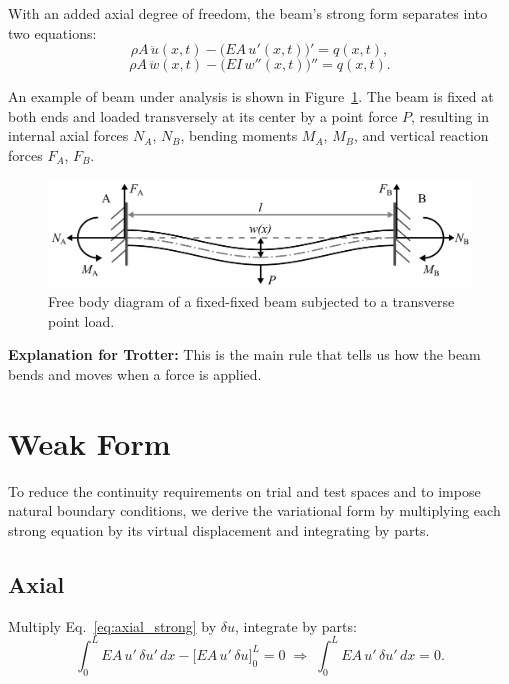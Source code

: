 \documentclass{article}
\begin{document}
	With an added axial degree of freedom, the beam’s strong form separates into two equations:
	\begin{equation}\label{eq:axial_strong}
		\rho A\,\ddot u(x,t)
		- \bigl(EA\,u'(x,t)\bigr)'
		= q(x,t),
	\end{equation}
	\begin{equation}\label{eq:transverse_strong}
		\rho A\,\ddot w(x,t)
		- \bigl(EI\,w''(x,t)\bigr)''
		= q(x,t).
	\end{equation}
	
	An example of beam under analysis is shown in Figure~\ref{fig:FFB}. The beam is fixed at both ends and loaded transversely at its center by a point force \(P\), resulting in internal axial forces \(N_A\), \(N_B\), bending moments \(M_A\), \(M_B\), and vertical reaction forces \(F_A\), \(F_B\).
	\begin{figure}[H]
		\centering
		\includegraphics[width=4.7in]{Figures/FFB_Figure.png}
		\caption[FFB]{\label{fig:FFB} 
			Free body diagram of a fixed-fixed beam subjected to a transverse point load.}
	\end{figure} 
	
	\textbf{Explanation for Trotter:} This is the main rule that tells us how the beam bends and moves when a force is applied.
	
	\section{Weak Form}
	To reduce the continuity requirements on trial and test spaces and to impose natural boundary conditions, we derive the variational form by multiplying each strong equation by its virtual displacement and integrating by parts.
	
	\subsection{Axial}
	Multiply Eq.~\eqref{eq:axial_strong} by \(\delta u\), integrate by parts:
	\begin{equation}\label{eq:axial_weak}
		\int_0^L EA\,u'\,\delta u'\,dx 
		- \bigl[EA\,u'\,\delta u\bigr]_0^L = 0
		\;\Longrightarrow\;
		\int_0^L EA\,u'\,\delta u'\,dx = 0.
	\end{equation}
	
\end{document}

